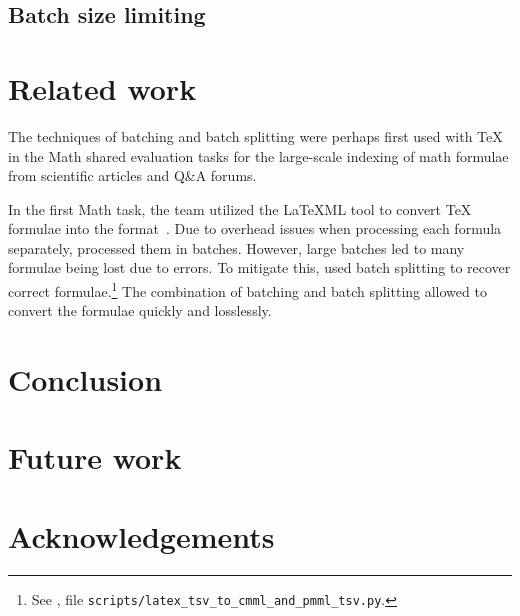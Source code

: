 \documentclass[final]{ltugboat}
\begin{document}
\subsection{Batch size limiting}

\section{Related work}
\label{sec:related-work}

The techniques of batching and batch splitting were perhaps first used with \TeX{} in the Math shared evaluation tasks for the large-scale indexing of math formulae from scientific articles and Q\&A forums.

In the first Math task, the  team utilized the \LaTeX ML tool to convert \TeX{} formulae into the  format~\cite[Section~2.2]{novotny2020three}. Due to overhead issues when processing each formula separately,  processed them in batches. However, large batches led to many formulae being lost due to errors. To mitigate this,  used batch splitting to recover correct formulae.\footnote{See , file \texttt{scripts/latex\_tsv\_to\_cmml\_and\_pmml\_tsv.py}.} The combination of batching and batch splitting allowed  to convert the formulae quickly and losslessly.

\section{Conclusion}
\label{sec:conclusion}

\section{Future work}
\label{sec:future-work}

\section*{Acknowledgements}


\begingroup
\RaggedRight

\endgroup

\makesignature
\end{document}
